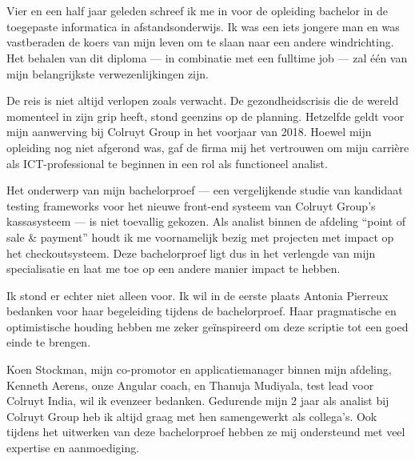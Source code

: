 
\chapter*{}
\label{ch:voorwoord}


Vier en een half jaar geleden schreef ik me in voor de opleiding bachelor in de toegepaste informatica in afstandsonderwijs. Ik was een iets jongere man en was vastberaden de koers van mijn leven om te slaan naar een andere windrichting. Het behalen van dit diploma — in combinatie met een fulltime job — zal één van mijn belangrijkste verwezenlijkingen zijn.

De reis is niet altijd verlopen zoals verwacht. De gezondheidscrisis die de wereld momenteel in zijn grip heeft, stond geenzins op de planning. Hetzelfde geldt voor mijn aanwerving bij Colruyt Group in het voorjaar van 2018. Hoewel mijn opleiding nog niet afgerond was, gaf de firma mij het vertrouwen om mijn carrière als ICT-professional te beginnen in een rol als functioneel analist.

Het onderwerp van mijn bachelorproef — een vergelijkende studie van kandidaat testing frameworks voor het nieuwe front-end systeem van Colruyt Group's kassasysteem — is niet toevallig gekozen. Als analist binnen de afdeling ``point of sale \& payment'' houdt ik me voornamelijk bezig met projecten met impact op het checkoutsysteem. Deze bachelorproef ligt dus in het verlengde van mijn specialisatie en laat me toe op een andere manier impact te hebben.

Ik stond er echter niet alleen voor. Ik wil in de eerste plaats Antonia Pierreux bedanken voor haar begeleiding tijdens de bachelorproef. Haar pragmatische en optimistische houding hebben me zeker geïnspireerd om deze scriptie tot een goed einde te brengen.

Koen Stockman, mijn co-promotor en applicatiemanager binnen mijn afdeling, Kenneth Aerens, onze Angular coach, en Thanuja Mudiyala, test lead voor Colruyt India, wil ik evenzeer bedanken. Gedurende mijn 2 jaar als analist bij Colruyt Group heb ik altijd graag met hen samengewerkt als collega's. Ook tijdens het uitwerken van deze bachelorproef hebben ze mij ondersteund met veel expertise en aanmoediging.

